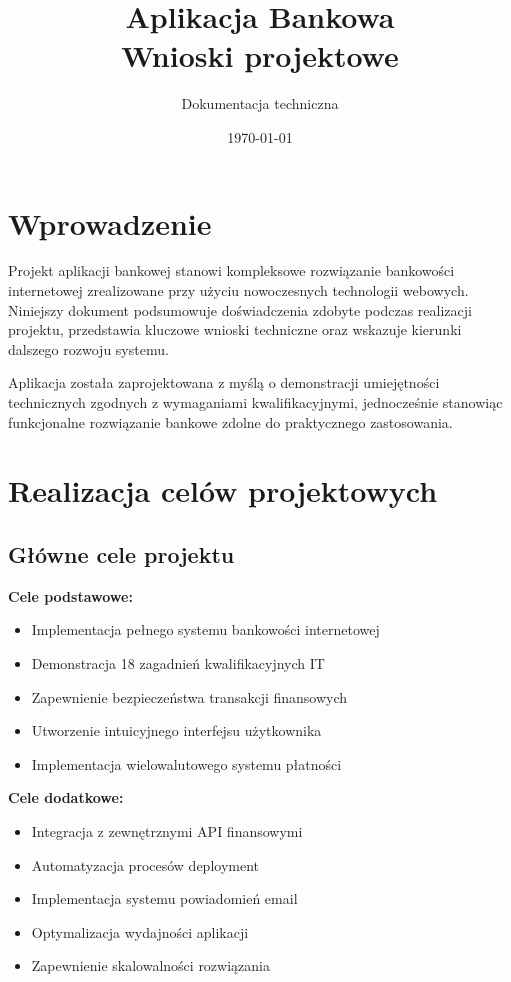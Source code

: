\documentclass[12pt,a4paper]{article}
\title{\textbf{Aplikacja Bankowa}\\[0.5cm]\Large Wnioski projektowe}
\author{Dokumentacja techniczna}
\date{\today}
\begin{document}
    \maketitle
    \thispagestyle{empty}

    \newpage
    \tableofcontents
    \newpage

    \section{Wprowadzenie}

    Projekt aplikacji bankowej stanowi kompleksowe rozwiązanie bankowości internetowej zrealizowane przy użyciu nowoczesnych technologii webowych. Niniejszy dokument podsumowuje doświadczenia zdobyte podczas realizacji projektu, przedstawia kluczowe wnioski techniczne oraz wskazuje kierunki dalszego rozwoju systemu.

    Aplikacja została zaprojektowana z myślą o demonstracji umiejętności technicznych zgodnych z wymaganiami kwalifikacyjnymi, jednocześnie stanowiąc funkcjonalne rozwiązanie bankowe zdolne do praktycznego zastosowania.

    \section{Realizacja celów projektowych}

    \subsection{Główne cele projektu}

    \textbf{Cele podstawowe:}
    \begin{itemize}
        \item Implementacja pełnego systemu bankowości internetowej
        \item Demonstracja 18 zagadnień kwalifikacyjnych IT
        \item Zapewnienie bezpieczeństwa transakcji finansowych
        \item Utworzenie intuicyjnego interfejsu użytkownika
        \item Implementacja wielowalutowego systemu płatności
    \end{itemize}

    \textbf{Cele dodatkowe:}
    \begin{itemize}
        \item Integracja z zewnętrznymi API finansowymi
        \item Automatyzacja procesów deployment
        \item Implementacja systemu powiadomień email
        \item Optymalizacja wydajności aplikacji
        \item Zapewnienie skalowalności rozwiązania
    \end{itemize}
\end{document}
